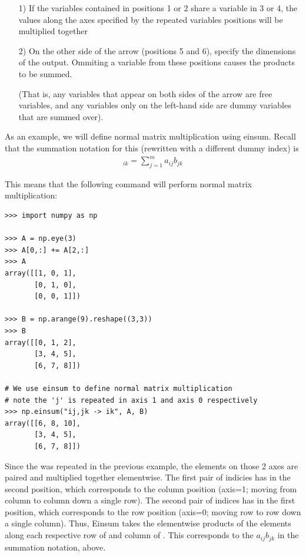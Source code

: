 \begin{enumerate}
\item[1)] If the variables contained in positions 1 or 2 share a variable in 3 or 4, the values along the axes specified by the repeated variables positions will be multiplied together\\
\item[2)] On the other side of the arrow (positions 5 and 6), specify the dimensions of the output. 
Ommiting a variable from these positions causes the products to be summed. 

(That is, any variables that appear on both sides of the arrow are free variables, and any variables only on the left-hand side are dummy variables that are summed over).
\end{enumerate}
\noindent As an example, we will define normal matrix multiplication using einsum. 
Recall that the summation notation for this (rewritten with a different dummy index) is 
\begin{align*}
[AB]_{ik} = \sum_{j=1}^{m }a_{ij}b_{jk}
\end{align*}

This means that the following  command will perform normal matrix multiplication:
\begin{lstlisting}
>>> import numpy as np

>>> A = np.eye(3)
>>> A[0,:] += A[2,:]
>>> A
array([[1, 0, 1],
       [0, 1, 0],
       [0, 0, 1]])

>>> B = np.arange(9).reshape((3,3))
>>> B
array([[0, 1, 2],
       [3, 4, 5],
       [6, 7, 8]])

# We use einsum to define normal matrix multiplication
# note the 'j' is repeated in axis 1 and axis 0 respectively
>>> np.einsum("ij,jk -> ik", A, B) 
array([[6, 8, 10],
       [3, 4, 5],
       [6, 7, 8]])

\end{lstlisting}

Since the  was repeated in the previous example, the elements on those 2 axes are paired and multiplied together elementwise.
The first pair of indicies has  in the second position, which corresponds to the column position (axis=1; moving from column to column down a single row). 
The second pair of indices has  in the first position, which corresponds to the row position (axis=0; moving row to row down a single column). 
Thus, Einsum takes the elementwise products of the elements along each respective row of  and column of . This corresponds to the $a_{ij}b_{jk}$ in the summation notation, above.

